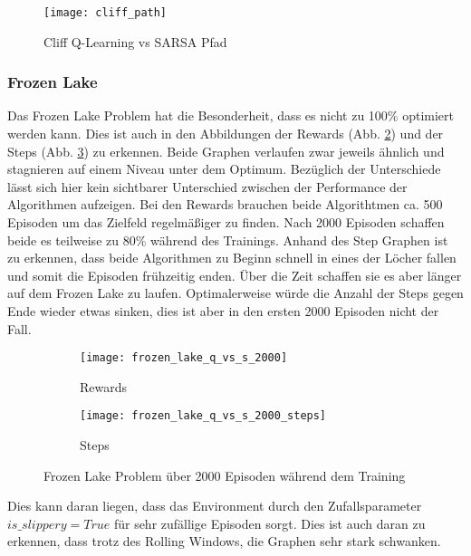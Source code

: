 \begin{figure}[H]
    \texttt{[image: cliff\_path]}
    \caption{Cliff Q-Learning vs SARSA Pfad}
    \label{fig:cliff_path}
\end{figure}

\subsubsection{Frozen Lake}

Das Frozen Lake Problem hat die Besonderheit, dass es nicht zu 100\% optimiert werden kann. Dies ist auch in den Abbildungen der Rewards (Abb. \ref{fig:frozen_rew}) und der Steps (Abb. \ref{fig:frozen_step}) zu erkennen. Beide Graphen verlaufen zwar jeweils ähnlich und stagnieren auf einem Niveau unter dem Optimum. Bezüglich der Unterschiede lässt sich hier kein sichtbarer Unterschied zwischen der Performance der Algorithmen aufzeigen. Bei den Rewards brauchen beide Algorithtmen ca. 500 Episoden um das Zielfeld regelmäßiger zu finden. Nach 2000 Episoden schaffen beide es teilweise zu 80\% während des Trainings. 
Anhand des Step Graphen ist zu erkennen, dass beide Algorithmen zu Beginn schnell in eines der Löcher fallen und somit die Episoden frühzeitig enden. Über die Zeit schaffen sie es aber länger auf dem Frozen Lake zu laufen. Optimalerweise würde die Anzahl der Steps gegen Ende wieder etwas sinken, dies ist aber in den ersten 2000 Episoden nicht der Fall.


\begin{figure}[H]
    \centering
    \begin{subfigure}{.5\textwidth}
      \centering
      \texttt{[image: frozen\_lake\_q\_vs\_s\_2000]}
      \caption{Rewards}
      \label{fig:frozen_rew}
    \end{subfigure}%
    \begin{subfigure}{.5\textwidth}
      \centering
      \texttt{[image: frozen\_lake\_q\_vs\_s\_2000\_steps]}
      \caption{Steps}
      \label{fig:frozen_step}
    \end{subfigure}
    \caption{Frozen Lake Problem über 2000 Episoden während dem Training}
    \label{fig:frozen_train}
\end{figure}

Dies kann daran liegen, dass das Environment durch den Zufallsparameter $is\_slippery = True$ für sehr zufällige Episoden sorgt. Dies ist auch daran zu erkennen, dass trotz des Rolling Windows, die Graphen sehr stark schwanken.

